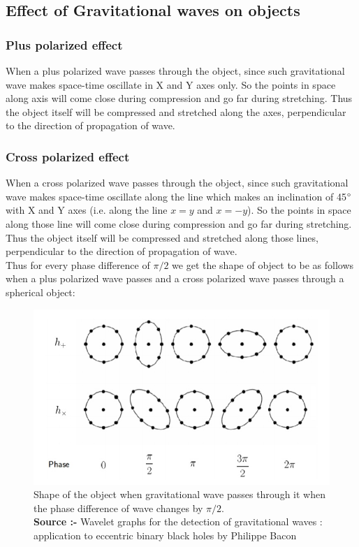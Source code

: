 \subsection{Effect of Gravitational waves on objects}
\subsubsection{Plus polarized effect}
When a plus polarized wave passes through the object, since such gravitational wave makes space-time oscillate in X and Y axes only. So the points in space along axis will come close during compression and go far during stretching. Thus the object itself will be compressed and stretched along the axes, perpendicular to the direction of propagation of wave.

\subsubsection{Cross polarized effect}
When a cross polarized wave passes through the object, since such gravitational wave makes space-time oscillate along the line which makes an inclination of 45$\degree$ with X and Y axes (i.e. along the line $x=y$ and $x=-y$). So the points in space along those line will come close during compression and go far during stretching. Thus the object itself will be compressed and stretched along those lines, perpendicular to the direction of propagation of wave.
\\

Thus for every phase difference of $\pi/2$ we get the shape of object to be as follows
when a plus polarized wave passes and a cross polarized wave passes through a spherical object:

\begin{figure}[h]
    \centering
    \includegraphics[scale=0.5]{images.tex/effect_of_gw.jpeg}
    \caption{Shape of the object when gravitational wave passes through it when the phase difference of wave changes by $\pi/2$.\\
    \textbf{Source :-} Wavelet graphs for the detection of gravitational waves : application to eccentric binary black holes by Philippe Bacon}
\end{figure}
